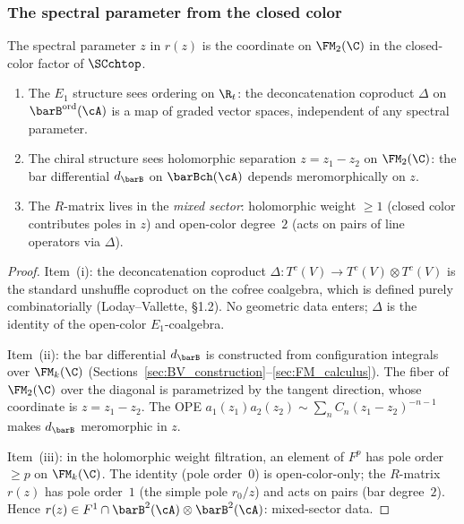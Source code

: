 \subsubsection*{The spectral parameter from the closed color}

\begin{theorem}
The spectral parameter $z$ in $r(z)$ is the coordinate on
$\FM_2(\C)$ in the closed-color factor of $\SCchtop$.
\begin{enumerate}[label=\textup{(\roman*)}]
\item The $E_1$ structure sees ordering on $\R_t$: the
 deconcatenation coproduct $\Delta$ on
 $\barB^{\mathrm{ord}}(\cA)$ is a map of graded vector spaces,
 independent of any spectral parameter.
\item The chiral structure sees holomorphic separation
 $z = z_1 - z_2$ on $\FM_2(\C)$: the bar differential
 $d_{\barB}$ on $\barBch(\cA)$ depends meromorphically on $z$.
\item The $R$-matrix lives in the \emph{mixed sector}:
 holomorphic weight $\ge 1$ (closed color contributes poles
 in $z$) and open-color degree~$2$ (acts on pairs of line
 operators via $\Delta$).
\end{enumerate}
\end{theorem}

\begin{proof}
Item~(i): the deconcatenation coproduct
$\Delta \colon T^c(V) \to T^c(V) \otimes T^c(V)$ is the
standard unshuffle coproduct on the cofree coalgebra, which is
defined purely combinatorially (Loday--Vallette, \S1.2). No
geometric data enters; $\Delta$ is the identity of the
open-color $E_1$-coalgebra.

Item~(ii): the bar differential $d_{\barB}$ is constructed
from configuration integrals over $\FM_k(\C)$
(Sections~\ref{sec:BV_construction}--\ref{sec:FM_calculus}).
The fiber of $\FM_2(\C)$ over the diagonal is parametrized by
the tangent direction, whose coordinate is $z = z_1 - z_2$.
The OPE $a_1(z_1) a_2(z_2) \sim \sum_n C_n (z_1-z_2)^{-n-1}$
makes $d_{\barB}$ meromorphic in $z$.

Item~(iii): in the holomorphic weight filtration, an element of
$F^p$ has pole order $\ge p$ on $\FM_k(\C)$. The identity
(pole order~$0$) is open-color-only; the $R$-matrix $r(z)$
has pole order~$1$ (the simple pole $r_0/z$) and acts on pairs
(bar degree~$2$). Hence $r(z) \in F^1 \cap
\barB^2(\cA) \otimes \barB^2(\cA)$: mixed-sector data.
\end{proof}

